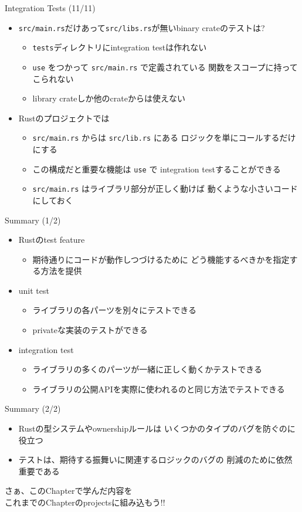 \documentclass[cjk,14pt,xcolor=dvipsnames,table,dvipdfmx,professional font,t,fragile]{beamer}
\begin{document}
\begin{frame}[fragile]{Integration Tests (11/11)}
\begin{itemize}
 \item \verb|src/main.rs|だけあって\verb|src/libs.rs|が無いbinary crateのテストは?
       \begin{itemize}
	\item \texttt{tests}ディレクトリにintegration testは作れない
	\item \verb|use| をつかって \verb|src/main.rs| で定義されている
	      関数をスコープに持ってこられない
	\item library crateしか他のcrateからは使えない
       \end{itemize}
 \item Rustのプロジェクトでは
       \begin{itemize}
	\item \verb|src/main.rs| からは \verb|src/lib.rs| にある
	      ロジックを単にコールするだけにする
	\item この構成だと重要な機能は \verb|use| で
	      integration testすることができる
	\item \verb|src/main.rs| はライブラリ部分が正しく動けば
	      動くような小さいコードにしておく
       \end{itemize}
\end{itemize}
\end{frame}

\begin{frame}[fragile]{Summary (1/2)}
 \begin{itemize}
  \item Rustのtest feature
	\begin{itemize}
	 \item 期待通りにコードが動作しつづけるために
	       どう機能するべきかを指定する方法を提供
	\end{itemize}
  \item unit test
	\begin{itemize}
	 \item ライブラリの各パーツを別々にテストできる
	 \item privateな実装のテストができる
	\end{itemize}
  \item integration test
	\begin{itemize}
	 \item ライブラリの多くのパーツが一緒に正しく動くかテストできる
	 \item ライブラリの公開APIを実際に使われるのと同じ方法でテストできる
	\end{itemize}
 \end{itemize}
\end{frame}

\begin{frame}{Summary (2/2)}
\begin{itemize}
 \item Rustの型システムやownershipルールは
       いくつかのタイプのバグを防ぐのに役立つ
 \item テストは、期待する振舞いに関連するロジックのバグの
       削減のために依然重要である
\end{itemize}
\pause
\begin{center}
さぁ、このChapterで学んだ内容を\\
これまでのChapterのprojectsに組み込もう!!
\end{center}
\end{frame}
\end{document}
